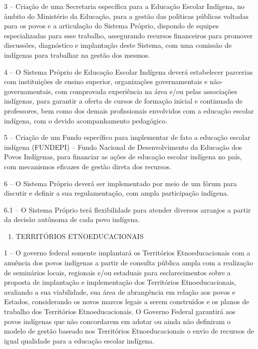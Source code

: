 \documentclass[
]{book}
\providecommand{\tightlist}{%
  \setlength{\itemsep}{0pt}\setlength{\parskip}{0pt}}
\begin{document}
3 -- Criação de uma Secretaria específica para a Educação Escolar Indígena, no âmbito do Ministério da Educação, para a gestão das políticas públicas voltadas para os povos e a articulação do Sistema Próprio, dispondo de equipes especializadas para esse trabalho, assegurando recursos financeiros para promover discussões, diagnóstico e implantação deste Sistema, com uma comissão de indígenas para trabalhar na gestão dos mesmos.

4 -- O Sistema Próprio de Educação Escolar Indígena deverá estabelecer parcerias com instituições de ensino superior, organizações governamentais e não-governamentais, com comprovada experiência na área e/ou pelas associações indígenas, para garantir a oferta de cursos de formação inicial e continuada de professores, bem como dos demais profissionais envolvidos com a educação escolar indígena, com o devido acompanhamento pedagógico.

5 -- Criação de um Fundo específico para implementar de fato a educação escolar indígena (FUNDEPI) -- Fundo Nacional de Desenvolvimento da Educação dos Povos Indígenas, para financiar as ações de educação escolar indígena no país, com mecanismos eficazes de gestão direta dos recursos.

6 -- O Sistema Próprio deverá ser implementado por meio de um fórum para discutir e definir a sua regulamentação, com ampla participação indígena.

6.1 -- O Sistema Próprio terá flexibilidade para atender diversos arranjos a partir da decisão autônoma de cada povo indígena.

\begin{enumerate}
\def\labelenumi{\Alph{enumi})}
\setcounter{enumi}{1}
\tightlist
\item
  TERRITÓRIOS ETNOEDUCACIONAIS
\end{enumerate}

1 -- O governo federal somente implantará os Territórios Etnoeducacionais com a anuência dos povos indígenas a partir de consulta pública ampla com a realização de seminários locais, regionais e/ou estaduais para esclarecimentos sobre a proposta de implantação e implementação dos Territórios Etnoeducacionais, avaliando a sua viabilidade, sua área de abrangência em relação aos povos e Estados, considerando os novos marcos legais a serem construídos e os planos de trabalho dos Territórios Etnoeducacionais. O Governo Federal garantirá aos povos indígenas que não concordarem em adotar ou ainda não definiram o modelo de gestão baseado nos Territórios Etnoeducacionais o envio de recursos de igual qualidade para a educação escolar indígena.
\end{document}
